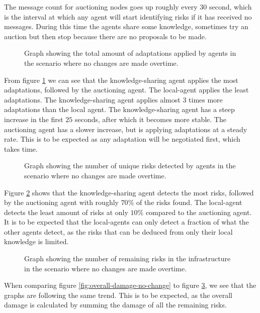 The message count for auctioning nodes goes up roughly every $30$ second, which is the interval at which any agent will start identifying risks if it has received no messages. During this time the agents share some knowledge, sometimes try an auction but then stop because there are no proposals to be made.

\begin{figure}[H]
    \centering
    
    \caption{Graph showing the total amount of adaptations applied by agents in the scenario where no changes are made overtime.}
    \label{fig:proposals-no-change}
\end{figure}

From figure \ref{fig:proposals-no-change} we can see that the knowledge-sharing agent applies the most adaptations, followed by the auctioning agent. The local-agent applies the least adaptations. The knowledge-sharing agent applies almost $3$ times  more adaptations than the local agent. The knowledge-sharing agent has a steep increase in the first $25$ seconds, after which it becomes more stable. The auctioning agent has a slower increase, but is applying adaptations at a steady rate. This is to be expected as any adaptation will be negotiated first, which takes time.

\begin{figure}[H]
    \centering
        
    \caption{Graph showing the number of unique risks detected by agents in the scenario where no changes are made overtime.}
    \label{fig:risk-count-no-change}
\end{figure}

Figure \ref{fig:risk-count-no-change} shows that the knowledge-sharing agent detects the most risks, followed by the auctioning agent with roughly $70\%$ of the risks found. The local-agent detects the least amount of risks at only $10\%$ compared to the auctioning agent. It is to be expected that the local-agents can only detect a fraction of what the other agents detect, as the risks that can be deduced from only their local knowledge is limited.

\begin{figure}[H]
    \centering
        
    \caption{Graph showing the number of remaining risks in the infrastructure in the scenario where no changes are made overtime.}
    \label{fig:risk-remaining-no-change}
\end{figure}

When comparing figure \ref{fig:overall-damage-no-change} to figure \ref{fig:risk-remaining-no-change}, we see that the graphs are following the same trend. This is to be expected, as the overall damage is calculated by summing the damage of all the remaining risks.

